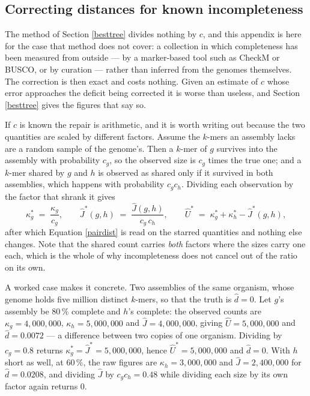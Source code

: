 \documentclass[pdflatex,sn-vancouver-num]{sn-jnl}
\begin{document}
\begin{appendices}
\section{Correcting distances for known incompleteness}\label{correction}

The method of Section \ref{besttree} divides nothing by $c$, and this appendix is here for the case
that method does not cover: a collection in which completeness has been measured from outside ---
by a marker-based tool such as CheckM or BUSCO, or by curation --- rather than inferred from the
genomes themselves. The correction is then exact and costs nothing. Given an estimate of $c$ whose
error approaches the deficit being corrected it is worse than useless, and Section \ref{besttree}
gives the figures that say so.

If $c$ is known the repair is arithmetic, and it is worth writing out because the two quantities are scaled by different factors. Assume the $k$-mers an assembly lacks are
a random sample of the genome's. Then a $k$-mer of $g$ survives into the assembly with probability
$c_g$, so the observed size is $c_g$ times the true one; and a $k$-mer shared by $g$ and $h$ is
observed as shared only if it survived in both assemblies, which happens with probability
$c_g c_h$. Dividing each observation by the factor that shrank it gives
%
\begin{equation}
  \kappa^{\ast}_g \;=\; \frac{\kappa_g}{c_g} ,
  \qquad
  \widehat{J}^{\ast}(g,h) \;=\; \frac{\widehat{J}(g,h)}{c_g\,c_h} ,
  \qquad
  \widehat{U}^{\ast} \;=\; \kappa^{\ast}_g + \kappa^{\ast}_h - \widehat{J}^{\ast}(g,h) ,
  \label{completecorr}
\end{equation}
%
after which Equation \eqref{pairdist} is read on the starred quantities and nothing else changes.
Note that the shared count carries \emph{both} factors where the sizes carry one each, which is the
whole of why incompleteness does not cancel out of the ratio on its own.

A worked case makes it concrete. Two assemblies of the same organism, whose genome holds five million
distinct $k$-mers, so that the truth is $\widehat{d} = 0$. Let $g$'s assembly be $80\,\%$ complete and
$h$'s complete: the observed counts are $\kappa_g = 4{,}000{,}000$, $\kappa_h = 5{,}000{,}000$ and
$\widehat{J} = 4{,}000{,}000$, giving $\widehat{U} = 5{,}000{,}000$ and $\widehat{d} = 0.0072$ ---
a difference between two copies of one organism. Dividing by $c_g = 0.8$ returns
$\kappa^{\ast}_g = \widehat{J}^{\ast} = 5{,}000{,}000$, hence $\widehat{U}^{\ast} = 5{,}000{,}000$ and
$\widehat{d} = 0$. With $h$ short as well, at $60\,\%$, the raw figures are $\kappa_h = 3{,}000{,}000$ and
$\widehat{J} = 2{,}400{,}000$ for $\widehat{d} = 0.0208$, and dividing $\widehat{J}$ by
$c_g c_h = 0.48$ while dividing each size by its own factor again returns $0$.


\end{appendices}
\end{document}
